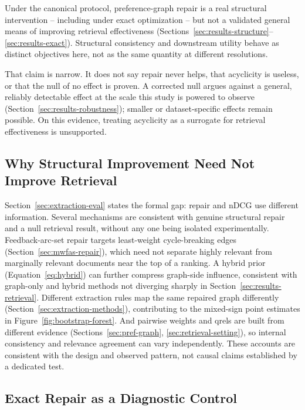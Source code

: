 \documentclass[pdflatex,sn-basic,Numbered]{sn-jnl}
\begin{document}
Under the canonical protocol, preference-graph repair is a real structural
intervention -- including under exact optimization -- but not a validated
general means of improving retrieval effectiveness
(Sections~\ref{sec:results-structure}--\ref{sec:results-exact}). Structural
consistency and downstream utility behave as distinct objectives here, not
as the same quantity at different resolutions.

That claim is narrow. It does not say repair never helps, that acyclicity
is useless, or that the null of no effect is proven. A corrected null
argues against a general, reliably detectable effect at the scale this
study is powered to observe (Section~\ref{sec:results-robustness}); smaller
or dataset-specific effects remain possible. On this evidence, treating
acyclicity as a surrogate for retrieval effectiveness is unsupported.

\subsection{Why Structural Improvement Need Not Improve Retrieval}
\label{sec:discussion-mechanism}

Section~\ref{sec:extraction-eval} states the formal gap: repair and nDCG
use different information. Several mechanisms are consistent with genuine
structural repair and a null retrieval result, without any one being
isolated experimentally. Feedback-arc-set repair targets least-weight
cycle-breaking edges (Section~\ref{sec:mwfas-repair}), which need not
separate highly relevant from marginally relevant documents near the top of
a ranking. A hybrid prior (Equation~\eqref{eq:hybrid}) can further compress
graph-side influence, consistent with graph-only and hybrid methods not
diverging sharply in Section~\ref{sec:results-retrieval}. Different
extraction rules map the same repaired graph differently
(Section~\ref{sec:extraction-methods}), contributing to the mixed-sign
point estimates in Figure~\ref{fig:bootstrap-forest}. And pairwise weights
and qrels are built from different evidence
(Sections~\ref{sec:pref-graph}, \ref{sec:retrieval-setting}), so internal
consistency and relevance agreement can vary independently. These accounts
are consistent with the design and observed pattern, not causal claims
established by a dedicated test.

\subsection{Exact Repair as a Diagnostic Control}
\label{sec:discussion-exact}
\end{document}
